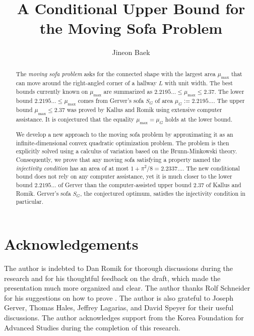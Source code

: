 \documentclass[10pt]{article}
\title{A Conditional Upper Bound for the Moving Sofa Problem}
\author{Jineon Baek}
\theoremstyle{plain}
\theoremstyle{definition}
\theoremstyle{remark}
\begin{document}
\maketitle

\begin{abstract}
The \emph{moving sofa problem} asks for the connected shape with the largest area $\mu_{\text{max}}$ that can move around the right-angled corner of a hallway $L$ with unit width. The best bounds currently known on $\mu_{\max}$ are summarized as $2.2195\ldots \leq \mu_{\max} \leq 2.37$. The lower bound $2.2195\ldots \leq \mu_{\max}$ comes from Gerver's sofa $S_G$ of area $\mu_G := 2.2195\ldots$. The upper bound $\mu_{\max} \leq 2.37$ was proved by Kallus and Romik using extensive computer assistance. It is conjectured that the equality $\mu_{\max} = \mu_G$ holds at the lower bound.

We develop a new approach to the moving sofa problem by approximating it as an infinite-dimensional convex quadratic optimization problem. The problem is then explicitly solved using a calculus of variation based on the Brunn-Minkowski theory. Consequently, we prove that any moving sofa satisfying a property named the \emph{injectivity condition} has an area of at most $1 + \pi^2/8 = 2.2337\dots$. The new conditional bound does not rely on any computer assistance, yet it is much closer to the lower bound $2.2195\ldots$ of Gerver than the computer-assisted upper bound $2.37$ of Kallus and Romik. Gerver's sofa $S_G$, the conjectured optimum, satisfies the injectivity condition in particular.
\end{abstract}

\tableofcontents



\section*{Acknowledgements}

The author is indebted to Dan Romik for thorough discussions during the research and for his thoughtful feedback on the draft, which made the presentation much more organized and clear. The author thanks Rolf Schneider for his suggestions on how to prove . The author is also grateful to Joseph Gerver, Thomas Hales, Jeffrey Lagarias, and David Speyer for their useful discussions. The author acknowledges support from the Korea Foundation for Advanced Studies during the completion of this research.
\printbibliography
\end{document}
